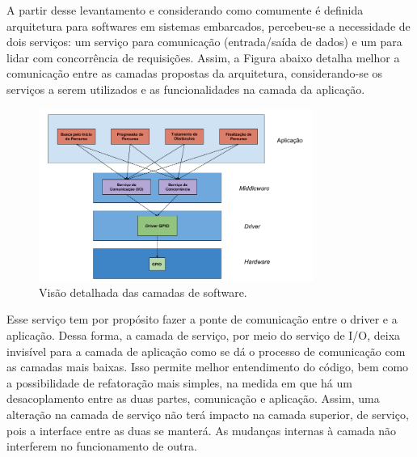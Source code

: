 A partir desse levantamento e considerando como comumente é definida arquitetura para softwares em sistemas embarcados, percebeu-se a necessidade de dois serviços: um serviço para comunicação (entrada/saída de dados) e um para lidar com concorrência de requisições. Assim, a Figura abaixo detalha melhor a comunicação entre as camadas propostas da arquitetura, considerando-se os serviços a serem utilizados e as funcionalidades na camada da aplicação.

\par
\begin{figure}[h]
  \centering
  \includegraphics[width=0.8\textwidth]{figures/layers-soft.png}
  \caption{Visão detalhada das camadas de software.}
  \label{fig:layer-soft}
\end{figure}
\FloatBarrier
\par

Esse serviço tem por propósito fazer a ponte de comunicação entre o driver e a aplicação. Dessa forma, a camada de serviço, por meio do serviço de I/O, deixa invisível para a camada de aplicação como se dá o processo de comunicação com as camadas mais baixas. Isso permite melhor entendimento do código, bem como a possibilidade de refatoração mais simples, na medida em que há um desacoplamento entre as duas partes, comunicação e aplicação. Assim, uma alteração na camada de serviço não terá impacto na camada superior, de serviço, pois a interface entre as duas se manterá. As mudanças internas à camada não interferem no funcionamento de outra.

